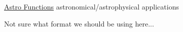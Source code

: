 
\begin{DoxyItemize}
\item \hyperlink{astro}{Astro Functions} astronomical/astrophysical applications
\end{DoxyItemize}

Not sure what format we should be using here... 